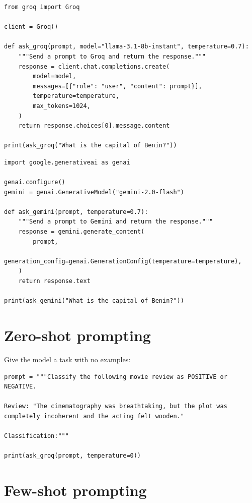 \begin{verbatim}
from groq import Groq

client = Groq()

def ask_groq(prompt, model="llama-3.1-8b-instant", temperature=0.7):
    """Send a prompt to Groq and return the response."""
    response = client.chat.completions.create(
        model=model,
        messages=[{"role": "user", "content": prompt}],
        temperature=temperature,
        max_tokens=1024,
    )
    return response.choices[0].message.content

print(ask_groq("What is the capital of Benin?"))
\end{verbatim}

\begin{verbatim}
import google.generativeai as genai

genai.configure()
gemini = genai.GenerativeModel("gemini-2.0-flash")

def ask_gemini(prompt, temperature=0.7):
    """Send a prompt to Gemini and return the response."""
    response = gemini.generate_content(
        prompt,
        generation_config=genai.GenerationConfig(temperature=temperature),
    )
    return response.text

print(ask_gemini("What is the capital of Benin?"))
\end{verbatim}

\section{Zero-shot prompting}

Give the model a task with no examples:

\begin{verbatim}
prompt = """Classify the following movie review as POSITIVE or NEGATIVE.

Review: "The cinematography was breathtaking, but the plot was
completely incoherent and the acting felt wooden."

Classification:"""

print(ask_groq(prompt, temperature=0))
\end{verbatim}

\section{Few-shot prompting}

